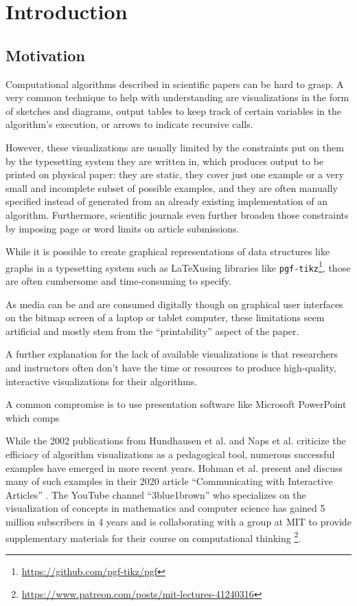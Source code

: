 \section{Introduction}

\subsection{Motivation}

Computational algorithms described in scientific papers can be hard to grasp.
A very common technique to help with understanding are visualizations in the form of sketches and diagrams, output tables to keep track of certain variables in the algorithm's execution, or arrows to indicate recursive calls.

However, these visualizations are usually limited by the constraints put on them by the typesetting system they are written in, which produces output to be printed on physical paper: they are static, they cover just one example or a very small and incomplete subset of possible examples, and they are often manually specified instead of generated from an already existing implementation of an algorithm. Furthermore, scientific journals even further broaden those constraints by imposing page or word limits on article submissions.

While it is possible to create graphical representations of data structures like graphs in a typesetting system such as \LaTeX  using libraries like \texttt{pgf-tikz}\footnote{\url{https://github.com/pgf-tikz/pgf}}, those are often cumbersome and time-consuming  to specify.

As media can be and are consumed digitally though on graphical user interfaces on the bitmap screen of a laptop or tablet computer, these limitations seem artificial and mostly stem from the ``printability'' aspect of the paper.


A further explanation for the lack of available visualizations is that researchers and instructors often don't have the time or resources to produce high-quality, interactive visualizations for their algorithms.

A common compromise is to use presentation software like Microsoft PowerPoint which comps  

While the 2002 publications from Hundhausen et al. \cite{hundhausen2002meta} and Naps et al. \cite{naps2002exploring} criticize the efficiacy of algorithm visualizations as a pedagogical tool, numerous successful examples have emerged in more recent years.
Hohman et al. present and discuss many of such examples in their 2020 article ``Communicating with Interactive Articles'' \cite{hohman2020communicating}.
The YouTube channel ``3blue1brown'' who specializes on the visualization of concepts in mathematics and computer science has gained 5 million subscribers in 4 years and is collaborating with a group at MIT to provide supplementary materials for their course on computational thinking \footnote{\url{https://www.patreon.com/posts/mit-lectures-41240316}}.


